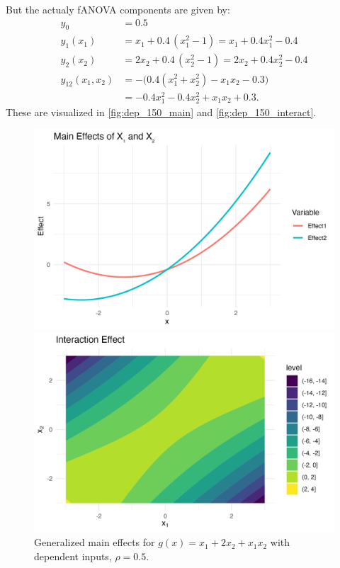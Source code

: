 But the actualy fANOVA components are given by:
\begin{align*}
y_0 &= 0.5 \\[3pt]
y_1(x_1) &= x_1 + 0.4\,(x_1^2 - 1)
        = x_1 + 0.4x_1^2 - 0.4 \\[3pt]
y_2(x_2) &= 2x_2 + 0.4\,(x_2^2 - 1)
        = 2x_2 + 0.4x_2^2 - 0.4 \\[3pt]
y_{12}(x_1,x_2) 
&= -\Big( 0.4(x_1^2 + x_2^2) - x_1 x_2 - 0.3 \Big) \\[3pt]
&= -0.4x_1^2 - 0.4x_2^2 + x_1 x_2 + 0.3.
\end{align*}
These are visualized in \autoref{fig:dep_150_main} and \autoref{fig:dep_150_interact}.
\begin{figure}[htpb]
    \centering
    \begin{minipage}[t]{0.49\textwidth}
        \centering
        \includegraphics[width=\textwidth]{images/running_ex_a1p10_a2p20_a11p00_a22p00_a12p10_rhop05_main.png}
        \caption{Generalized main effects for $g(x) = x_1 + 2 x_2 + x_1 x_2$ with dependent inputs, $\rho = 0.5$.}
        \label{fig:dep_150_main}
    \end{minipage}%
    \hfill
    \begin{minipage}[t]{0.49\textwidth}
        \centering
        \includegraphics[width=\textwidth]{images/running_ex_a1p10_a2p20_a11p00_a22p00_a12p10_rhop05_interaction.png}

\end{minipage}
\end{figure}
